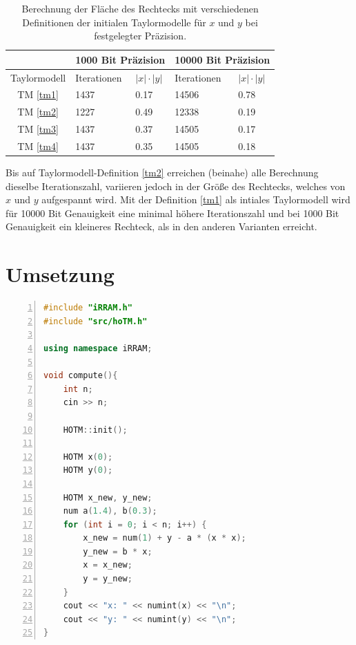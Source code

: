  
\begin{table}[tbh]
\centering
\begin{tabular}{|c||l|l||l|l|}
\hline
&\multicolumn{2}{c||}{1000 Bit Präzision} & \multicolumn{2}{c|}{10000 Bit Präzision} \\
\hline
Taylormodell & Iterationen & $|x| \cdot |y|$ &Iterationen & $|x| \cdot |y|$\\
\hline
TM \ref{tm1} & 1437 & 0.17 &14506 & 0.78 \\ 
TM \ref{tm2}  & 1227 & 0.49&12338 & 0.19  \\
TM \ref{tm3} & 1437 &  0.37&14505 & 0.17  \\                                                                 
TM \ref{tm4}  & 1437 & 0.35 &14505 & 0.18  \\
\hline 
\end{tabular}

\caption[Experimentelle Taylormodell Varianten]{Berechnung der Fläche des Rechtecks mit verschiedenen Definitionen der initialen Taylormodelle für $x$ und $y$ bei festgelegter Präzision.}
\label{tab:tm}
\end{table}
 
 
Bis auf Taylormodell-Definition \ref{tm2} erreichen (beinahe) alle Berechnung dieselbe Iterationszahl, variieren jedoch in der Größe des Rechtecks, welches von $x$ und $y$ aufgespannt wird. Mit der Definition \ref{tm1} als intiales Taylormodell wird für 10000 Bit Genauigkeit eine minimal höhere Iterationszahl und bei 1000 Bit Genauigkeit ein kleineres Rechteck, als in den anderen Varianten erreicht.
 
 
\newpage 
 \section{Umsetzung}
  \begin{lstlisting}[language=C++, caption=Implementierung der H\e non-Abbildung,captionpos=b,xleftmargin=15pt, numbers=left,stepnumber=1]
#include "iRRAM.h"
#include "src/hoTM.h"

using namespace iRRAM;

void compute(){
    int n;
    cin >> n;

    HOTM::init();

    HOTM x(0);
    HOTM y(0);
    
    HOTM x_new, y_new;
    num a(1.4), b(0.3);
    for (int i = 0; i < n; i++) {
        x_new = num(1) + y - a * (x * x);
        y_new = b * x;
        x = x_new;
        y = y_new;
    }
    cout << "x: " << numint(x) << "\n";
    cout << "y: " << numint(y) << "\n";
}
\end{lstlisting}
 
 
 
 
 

